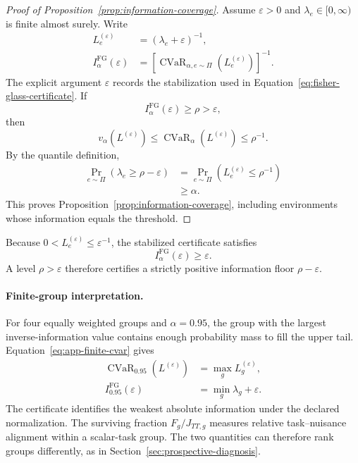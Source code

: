 \begin{proof}[Proof of Proposition~\ref{prop:information-coverage}]

Assume \(\varepsilon>0\) and \(\lambda_e\in[0,\infty)\) is finite almost surely. Write
\[
\begin{aligned}
L_e^{(\varepsilon)}
&=
(\lambda_e+\varepsilon)^{-1},
\\
I_\alpha^{\mathrm{FG}}(\varepsilon)
&=
\left[
\operatorname{CVaR}_{\alpha,e\sim\Pi}
\!\left(L_e^{(\varepsilon)}\right)
\right]^{-1}.
\end{aligned}
\tag{A.27}\label{eq:app-stabilized-certificate}
\]
The explicit argument \(\varepsilon\) records the stabilization used in Equation~\eqref{eq:fisher-glass-certificate}. If
\[
I_\alpha^{\mathrm{FG}}(\varepsilon)
\ge\rho>\varepsilon,
\]
then
\[
v_\alpha(L^{(\varepsilon)})
\le
\operatorname{CVaR}_{\alpha}(L^{(\varepsilon)})
\le
\rho^{-1}.
\]
By the quantile definition,
\[
\begin{aligned}
\Pr_{e\sim\Pi}\!\left(\lambda_e\ge\rho-\varepsilon\right)
&=
\Pr_{e\sim\Pi}\!\left(
L_e^{(\varepsilon)}\le\rho^{-1}
\right)
\\
&\ge\alpha.
\end{aligned}
\tag{A.28}\label{eq:app-information-coverage}
\]
This proves Proposition~\ref{prop:information-coverage}, including environments whose information equals the threshold. \end{proof}

Because \(0<L_e^{(\varepsilon)}\le\varepsilon^{-1}\), the stabilized certificate satisfies
\[
I_\alpha^{\mathrm{FG}}(\varepsilon)\ge\varepsilon.
\]
A level \(\rho>\varepsilon\) therefore certifies a strictly positive information floor \(\rho-\varepsilon\).

\paragraph{Finite-group interpretation.}

For four equally weighted groups and \(\alpha=0.95\), the group with the largest inverse-information value contains enough probability mass to fill the upper tail. Equation~\eqref{eq:app-finite-cvar} gives
\[
\begin{aligned}
\operatorname{CVaR}_{0.95}(L^{(\varepsilon)})
&=
\max_g L_g^{(\varepsilon)},
\\
I_{0.95}^{\mathrm{FG}}(\varepsilon)
&=
\min_g\lambda_g+\varepsilon.
\end{aligned}
\tag{A.29}\label{eq:app-four-group-certificate}
\]
The certificate identifies the weakest absolute information under the declared normalization. The surviving fraction \(F_g/J_{TT,g}\) measures relative task--nuisance alignment within a scalar-task group. The two quantities can therefore rank groups differently, as in Section~\ref{sec:prospective-diagnosis}.


